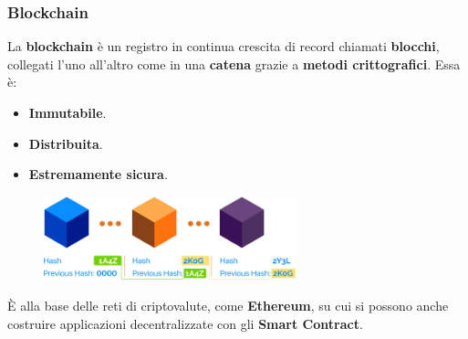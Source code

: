 \documentclass{beamer}
\begin{document}
\begin{frame}
	\frametitle{Blockchain}
	La \textbf{blockchain} è un registro in continua crescita di
	record chiamati \textbf{blocchi}, collegati l'uno all'altro come in una
	\textbf{catena} grazie a \textbf{metodi crittografici}.
	Essa è:
	\begin{itemize}
		\item \textbf{Immutabile}.
		\item \textbf{Distribuita}.
		\item \textbf{Estremamente sicura}.
	\end{itemize}
	\begin{figure}
		\includegraphics[width=0.65\textwidth]{figures/blockchain.png}
	\end{figure}
	\pause
	È alla base delle reti di criptovalute, come \textbf{Ethereum},
	su cui si possono anche costruire applicazioni decentralizzate con gli
	\textbf{Smart Contract}.
\end{frame}


\end{document}
